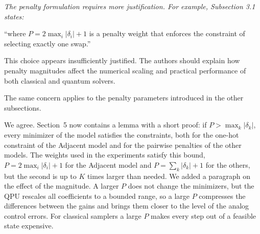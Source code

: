 \documentclass[12pt]{article}
\newenvironment{rc}[1]{\par\medskip\noindent\itshape\renewcommand{\emph}[1]{\textbf{##1}}\ignorespaces}{\par}
\newcommand{\answer}[1]{\par\smallskip\noindent #1\par}
\begin{document}
\begin{rc}{R2 3 --- Penalty parameters}
The penalty formulation requires more justification. For example, Subsection 3.1 states:

``where $P=2\max_i|\delta_i|+1$ is a penalty weight that enforces the constraint of selecting exactly one swap.''

This choice appears insufficiently justified. The authors should explain how penalty magnitudes affect the numerical scaling and practical performance of both classical and quantum solvers.

The same concern applies to the penalty parameters introduced in the other subsections.
\end{rc}
\answer{We agree. Section~5 now contains a lemma with a short proof: if $P>\max_k|\delta_k|$, every minimizer of the model satisfies the constraints, both for the one-hot constraint of the Adjacent model and for the pairwise penalties of the other models. The weights used in the experiments satisfy this bound, $P=2\max_i|\delta_i|+1$ for the Adjacent model and $P=\sum_k|\delta_k|+1$ for the others, but the second is up to $K$ times larger than needed. We added a paragraph on the effect of the magnitude. A larger $P$ does not change the minimizers, but the QPU rescales all coefficients to a bounded range, so a large $P$ compresses the differences between the gains and brings them closer to the level of the analog control errors. For classical samplers a large $P$ makes every step out of a feasible state expensive.}
\end{document}
